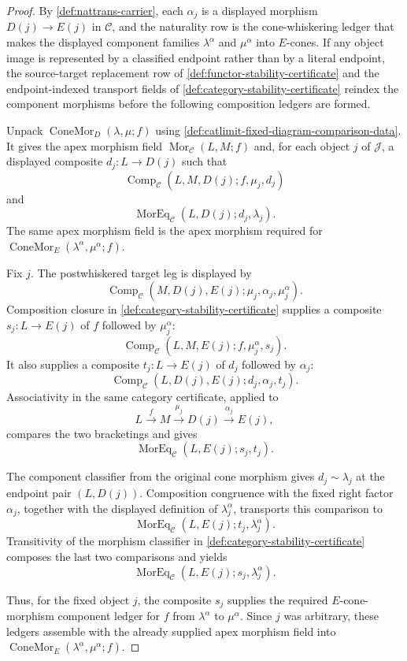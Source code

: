 \begin{proof}
By \autoref{def:nattrans-carrier}, each $\alpha_j$ is a displayed morphism $D(j)\to E(j)$ in $\mathcal C$, and the naturality row is the cone-whiskering ledger that makes the displayed component families $\lambda^\alpha$ and $\mu^\alpha$ into $E$-cones. If any object image is represented by a classified endpoint rather than by a literal endpoint, the source-target replacement row of \autoref{def:functor-stability-certificate} and the endpoint-indexed transport fields of \autoref{def:category-stability-certificate} reindex the component morphisms before the following composition ledgers are formed.

Unpack $\operatorname{ConeMor}_{D}(\lambda,\mu;f)$ using \autoref{def:catlimit-fixed-diagram-comparison-data}. It gives the apex morphism field $\operatorname{Mor}_{\mathcal C}(L,M;f)$ and, for each object $j$ of $\mathcal J$, a displayed composite $d_j:L\to D(j)$ such that
$$
\operatorname{Comp}_{\mathcal C}(L,M,D(j);f,\mu_j,d_j)
$$
and
$$
\operatorname{MorEq}_{\mathcal C}(L,D(j);d_j,\lambda_j).
$$
The same apex morphism field is the apex morphism required for $\operatorname{ConeMor}_{E}(\lambda^\alpha,\mu^\alpha;f)$.

Fix $j$. The postwhiskered target leg is displayed by
$$
\operatorname{Comp}_{\mathcal C}(M,D(j),E(j);\mu_j,\alpha_j,\mu^\alpha_j).
$$
Composition closure in \autoref{def:category-stability-certificate} supplies a composite $s_j:L\to E(j)$ of $f$ followed by $\mu^\alpha_j$:
$$
\operatorname{Comp}_{\mathcal C}(L,M,E(j);f,\mu^\alpha_j,s_j).
$$
It also supplies a composite $t_j:L\to E(j)$ of $d_j$ followed by $\alpha_j$:
$$
\operatorname{Comp}_{\mathcal C}(L,D(j),E(j);d_j,\alpha_j,t_j).
$$
Associativity in the same category certificate, applied to
$$
L\xrightarrow{f}M\xrightarrow{\mu_j}D(j)\xrightarrow{\alpha_j}E(j),
$$
compares the two bracketings and gives
$$
\operatorname{MorEq}_{\mathcal C}(L,E(j);s_j,t_j).
$$

The component classifier from the original cone morphism gives $d_j\sim\lambda_j$ at the endpoint pair $(L,D(j))$. Composition congruence with the fixed right factor $\alpha_j$, together with the displayed definition of $\lambda^\alpha_j$, transports this comparison to
$$
\operatorname{MorEq}_{\mathcal C}(L,E(j);t_j,\lambda^\alpha_j).
$$
Transitivity of the morphism classifier in \autoref{def:category-stability-certificate} composes the last two comparisons and yields
$$
\operatorname{MorEq}_{\mathcal C}(L,E(j);s_j,\lambda^\alpha_j).
$$

Thus, for the fixed object $j$, the composite $s_j$ supplies the required $E$-cone-morphism component ledger for $f$ from $\lambda^\alpha$ to $\mu^\alpha$. Since $j$ was arbitrary, these ledgers assemble with the already supplied apex morphism field into $\operatorname{ConeMor}_{E}(\lambda^\alpha,\mu^\alpha;f)$.
\end{proof}

